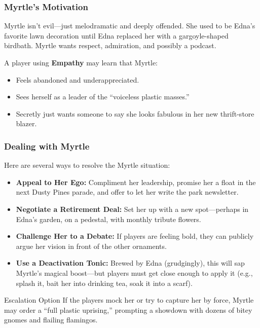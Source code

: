 \subsubsection{Myrtle’s Motivation}
Myrtle isn’t evil—just melodramatic and deeply offended. She used to be Edna’s favorite lawn decoration until Edna replaced her with a gargoyle-shaped birdbath. Myrtle wants respect, admiration, and possibly a podcast.

A player using \textbf{Empathy}  may learn that Myrtle:
\begin{itemize}
    \item Feels abandoned and underappreciated.
    \item Sees herself as a leader of the “voiceless plastic masses.”
    \item Secretly just wants someone to say she looks fabulous in her new thrift-store blazer.
\end{itemize}

\subsubsection{Dealing with Myrtle}
Here are several ways to resolve the Myrtle situation:
\begin{itemize}
    \item \textbf{Appeal to Her Ego:} Compliment her leadership, promise her a float in the next Dusty Pines parade, and offer to let her write the park newsletter.
    \item \textbf{Negotiate a Retirement Deal:} Set her up with a new spot—perhaps in Edna’s garden, on a pedestal, with monthly tribute flowers.
    \item \textbf{Challenge Her to a Debate:} If players are feeling bold, they can publicly argue her vision in front of the other ornaments.
    \item \textbf{Use a Deactivation Tonic:} Brewed by Edna (grudgingly), this will sap Myrtle’s magical boost—but players must get close enough to apply it (e.g., splash it, bait her into drinking tea, soak it into a scarf).
\end{itemize}

\begin{CommentBox}{Escalation Option}
    If the players mock her or try to capture her by force, Myrtle may order a “full plastic uprising,” prompting a showdown with dozens of bitey gnomes and flailing flamingos.
\end{CommentBox}

